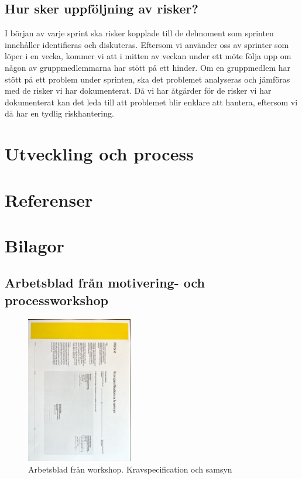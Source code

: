 \documentclass[12pt]{article}
\begin{document}
  \subsection{Hur sker uppföljning av risker?}
I början av varje sprint ska risker kopplade till de delmoment som sprinten innehåller identifieras och diskuteras. Eftersom vi använder oss av sprinter som löper i en vecka, kommer vi att i mitten av veckan under ett möte följa upp om någon av gruppmedlemmarna har stött på ett hinder. Om en gruppmedlem har stött på ett problem under sprinten, ska det problemet analyseras och jämföras med de risker vi har dokumenterat. Då vi har åtgärder för de risker vi har dokumenterat kan det leda till att problemet blir enklare att hantera, eftersom vi då har en tydlig riskhantering.


\section{Utveckling och process}


\section{Referenser}

\section{Bilagor}
\subsection{Arbetsblad från motivering- och processworkshop}


\begin{figure}[htp]
    \centering
    \includegraphics[width = 175px,angle=90]{KS.jpg}
    \caption{Arbetsblad från workshop. Kravspecification och samsyn}
    \label{fig:Bilaga samsyn}
\end{figure}
\end{document}
